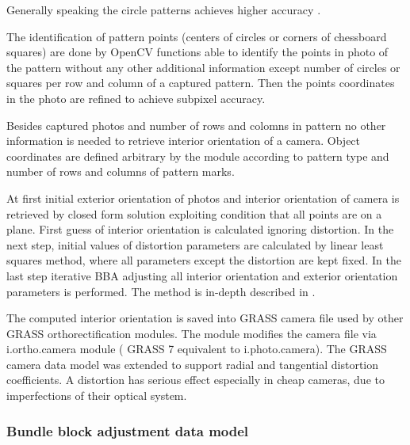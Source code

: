 \documentclass[a4paper,12pt]{article}
\begin{document}
Generally speaking the circle patterns achieves higher accuracy \cite{camera_calibration2013opencv}.

The identification of pattern points (centers of circles or corners of chessboard squares) 
are done by OpenCV functions able to identify the points in photo of the pattern 
without any other additional information except number of circles or squares per row and column
of a captured pattern. Then the points coordinates in the photo are refined to achieve subpixel accuracy.

Besides  captured photos and number of rows and colomns in pattern
no other information is needed to retrieve interior orientation of a camera.
Object coordinates are defined
arbitrary by the module according to pattern type and number of rows and columns of pattern marks.

At first  initial exterior orientation of photos and interior orientation of camera is retrieved 
by closed form solution exploiting condition that all points are on a plane.
First guess  of interior orientation is calculated ignoring distortion.
In the next step, initial values of distortion parameters are calculated by linear least squares method, 
where all parameters except the distortion are kept fixed.
In the last step iterative BBA adjusting all interior orientation and exterior orientation parameters 
is performed.
The method is in-depth described 
in \cite{zhang2000flexible}.



The computed interior orientation is saved into GRASS camera file used by other GRASS 
orthorectification modules. The module modifies the camera file via i.ortho.camera module 
( GRASS 7 equivalent to i.photo.camera).
The GRASS camera data model was extended to support radial and tangential distortion coefficients. 
A distortion has serious effect especially in cheap cameras, due to imperfections of their optical system.

\subsubsection{Bundle block adjustment data model}
 
\end{document}
